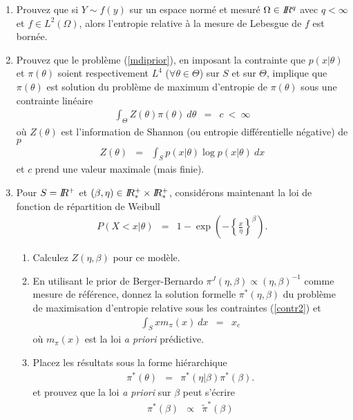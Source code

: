 \begin{enumerate}
\item Prouvez que si $Y\sim f(y)$ sur un espace normé et mesuré $\Omega\in I\!\!R^q$ avec $q<\infty$ et $f\in L^2(\Omega)$, alors l'entropie relative à la mesure de Lebesgue de $f$ est bornée. 
\item Prouvez que le problème  (\ref{mdiprior}), en imposant la contrainte que $p(x|\theta)$ et $\pi(\theta)$ soient respectivement $L^4$ ($\forall \theta\in\Theta$) sur $S$ et sur $\Theta$,  implique que $\pi(\theta)$ est solution du problème de maximum d'entropie de $\pi(\theta)$ sous une contrainte linéaire
\begin{eqnarray}
\int_{\Theta} Z(\theta) \pi(\theta) \ d\theta & = & c \ < \ \infty \label{contr2}
\end{eqnarray}
où $Z(\theta)$ est l'information de Shannon (ou entropie différentielle négative) de $p$ 
\begin{eqnarray*}
Z(\theta) & = & \int_{S} p(x|\theta) \log p(x|\theta) \ dx
\end{eqnarray*}
et $c$ prend une valeur maximale (mais finie). 
\item Pour $S=I\!\!R^+$ et $(\beta,\eta)\in I\!\!R^+_* \times I\!\!R^+_*$, considérons maintenant la loi de fonction de répartition de Weibull
\begin{eqnarray*}
P(X<x|\theta) & = & 1-\exp\left(-\left\{\frac{x}{\eta}\right\}^{\beta}\right).
\end{eqnarray*}
\begin{enumerate}
\item Calculez $Z(\eta,\beta)$ pour ce modèle.
\item En utilisant le prior de Berger-Bernardo $\pi^J(\eta,\beta)\propto (\eta,\beta)^{-1}$ comme mesure de référence, donnez la solution formelle $\pi^*(\eta,\beta)$  du problème de maximisation d'entropie relative sous les contraintes (\ref{contr2}) et
\begin{eqnarray}
\int_S x m_{\pi}(x) \ dx & = & x_e \label{cons2}
\end{eqnarray}
où $m_{\pi}(x)$ est la loi {\it a priori} prédictive. 
\item Placez les résultats sous la forme hiérarchique 
\begin{eqnarray*}
\pi^*(\theta) & = & \pi^*(\eta|\beta)\pi^*(\beta).
\end{eqnarray*}
et prouvez que la loi {\it a priori} sur $\beta$ peut s'écrire
\begin{eqnarray*}
\pi^*(\beta) & \propto & \tilde{\pi}^*(\beta) 
\end{eqnarray*}

\end{enumerate}
\end{enumerate}
